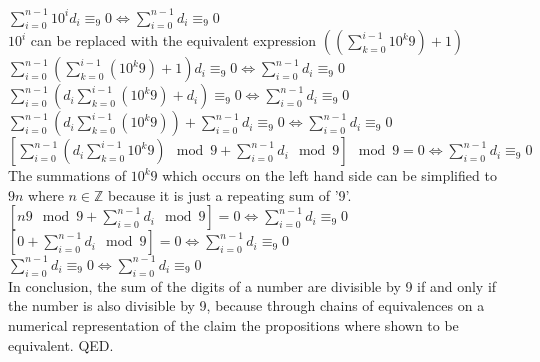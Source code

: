 \documentclass[solution,letterpaper]{cs20}
\begin{document}
\begin{problem}
\begin{solution}
            $\sum_{i=0}^{n-1} 10^{i}d_i \equiv_9 0 \iff \sum_{i=0}^{n-1}d_i \equiv_9 0$\\
            $10^i$ can be replaced with the equivalent expression $((\sum_{k=0}^{i-1}10^{k}9) + 1)$ \\
            $\sum_{i=0}^{n-1} (\sum_{k = 0}^{i-1} (10^{k}9) + 1)d_i \equiv_9 0 \iff \sum_{i=0}^{n-1}d_i \equiv_9 0$ \\
            $\sum_{i=0}^{n-1}( d_{i}\sum_{k = 0}^{i-1} (10^{k}9) + d_i) \equiv_9 0 \iff \sum_{i=0}^{n-1}d_i \equiv_9 0$ \\
            $\sum_{i=0}^{n-1}( d_{i}\sum_{k = 0}^{i-1}(10^{k}9))  + \sum_{i=0}^{n-1} d_i \equiv_9 0 \iff \sum_{i=0}^{n-1}d_i \equiv_9 0$ \\
            $[\sum_{i=0}^{n-1}( d_{i}\sum_{k = 0}^{i-1}10^{k}9) \mod 9 + \sum_{i=0}^{n-1} d_i \mod 9] \mod 9 = 0 \iff \sum_{i=0}^{n-1}d_i \equiv_9 0$ \\
            The summations of $10^{k}9$ which occurs on the left hand side can be simplified to $9n$ where ${n \in \mathbb{Z}}$ because it is just a repeating sum of '9'. \\
            $[n9 \mod 9 + \sum_{i=0}^{n-1} d_i \mod 9] = 0 \iff \sum_{i=0}^{n-1}d_i \equiv_9 0$ \\
            $[0 + \sum_{i=0}^{n-1} d_i \mod 9] = 0 \iff \sum_{i=0}^{n-1}d_i \equiv_9 0$ \\
            $\sum_{i=0}^{n-1}d_i \equiv_9 0 \iff \sum_{i=0}^{n-1}d_i \equiv_9 0$ \\

            In conclusion, the sum of the digits of a number are divisible by 9 if and only if the number is also divisible by 9, because through chains of equivalences on a numerical representation of the claim the propositions where shown to be equivalent. QED.
        \end{solution}
    \end{problem}
    \newpage
\end{document}
